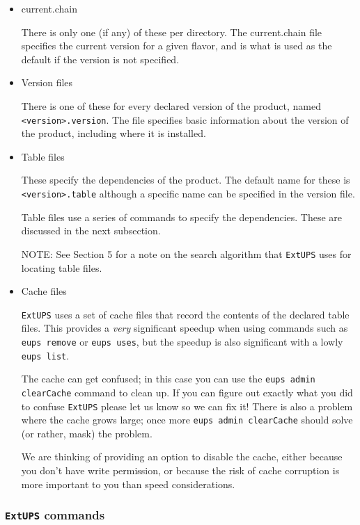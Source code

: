 \documentclass{article}
\newcommand{\code}[1]{\texttt{#1}}
\newcommand{\file}[1]{\texttt{#1}}
\newcommand{\eups}{\code{ExtUPS}\xspace}
\begin{document}
\begin{itemize}
  \item current.chain

    There is only one (if any) of these per directory.  The
    current.chain file specifies the current version for a given
    flavor, and is what is used as the default if the version is not
    specified.

  \item Version files

    There is one of these for every declared version of the product,
    named \file{<version>.version}. The file specifies basic information
    about the version of the product, including where it is installed.

  \item Table files

    These specify the dependencies of the product. The default name
    for these is \file{<version>.table} although a specific name can be specified in the
    version file.

    Table files use a series of commands to specify the dependencies. These are
    discussed in the next subsection.

    NOTE: See Section 5 for a note on the search algorithm that \eups uses for 
    locating table files.

  \item Cache files

    \eups uses a set of cache files that record the contents of the declared
    table files.  This provides a \emph{very} significant speedup when using
    commands such as \code{eups remove} or \code{eups uses}, but the speedup
    is also significant with a lowly \code{eups list}.

    The cache can get confused; in this case you can use the \code{eups admin clearCache}
    command to clean up.  If you can figure out exactly what you did to confuse
    \eups please let us know so we can fix it!  There is also a problem where
    the cache grows large;  once more \code{eups admin clearCache} should
    solve (or rather, mask) the problem.

    We are thinking of providing an option to disable the cache, either because
    you don't have write permission, or because the risk of cache corruption is
    more important to you than speed considerations.
\end{itemize}

\subsubsection{\eups commands}
\end{document}
